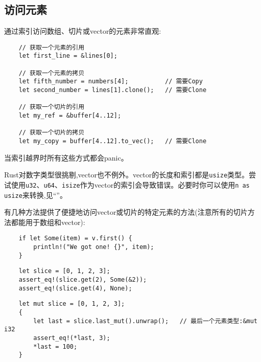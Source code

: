 \subsection{访问元素}
通过索引访问数组、切片或vector的元素非常直观:
\begin{verbatim}
    // 获取一个元素的引用
    let first_line = &lines[0];

    // 获取一个元素的拷贝 
    let fifth_number = numbers[4];          // 需要Copy
    let second_number = lines[1].clone();   // 需要Clone

    // 获取一个切片的引用
    let my_ref = &buffer[4..12];

    // 获取一个切片的拷贝
    let my_copy = buffer[4..12].to_vec();   // 需要Clone
\end{verbatim}

当索引越界时所有这些方式都会panic。

Rust对数字类型很挑剔,vector也不例外。vector的长度和索引都是\texttt{usize}类型。尝试使用\texttt{u32}、\texttt{u64}、\texttt{isize}作为vector的索引会导致错误。必要时你可以使用\texttt{n as usize}来转换,见“”。

有几种方法提供了便捷地访问vector或切片的特定元素的方法(注意所有的切片方法都能用于数组和vector):
\begin{verbatim}
    if let Some(item) = v.first() {
        println!("We got one! {}", item);
    }
\end{verbatim}


\begin{verbatim}
    let slice = [0, 1, 2, 3];
    assert_eq!(slice.get(2), Some(&2));
    assert_eq!(slice.get(4), None);
\end{verbatim}

\begin{verbatim}
    let mut slice = [0, 1, 2, 3];
    {
        let last = slice.last_mut().unwrap();   // 最后一个元素类型:&mut i32
        assert_eq!(*last, 3);
        *last = 100;
    }
\end{verbatim}

